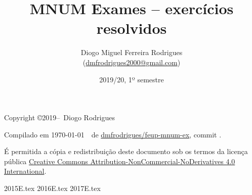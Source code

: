 \documentclass{mnum}
\title{MNUM Exames -- exercícios resolvidos}
\author{Diogo Miguel Ferreira Rodrigues \\ (\href{mailto:dmfrodrigues2000@gmail.com}{dmfrodrigues2000@gmail.com})}
\date{2019/20, 1º semestre}
\begin{document}
\maketitle
\begin{secondpage}
    Copyright \copyright 2019--\the\year\ Diogo Rodrigues\par
    \par
    \immediate{}
    Compilado em \today~\currenttime~de \href{https://github.com/dmfrodrigues/feup-mnum-ex}{dmfrodrigues/feup-mnum-ex}, commit \unskip.\par
    É permitida a cópia e redistribuição deste documento sob os termos da licença pública
    \href{https://creativecommons.org/licenses/by-nc-nd/4.0/}{Creative Commons Attribution-NonCommercial-NoDerivatives 4.0 International}.
\end{secondpage}
\frontmatter
\tableofcontents
\mainmatter
{2015E.tex}
{2016E.tex}
{2017E.tex}
\end{document}
